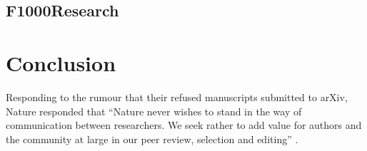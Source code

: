 \documentclass[letterpaper,twocolumn,superscriptaddress,showkeys]{revtex4}
\begin{document}

\subsection{F1000Research}


\section{Conclusion}


Responding to the rumour that their refused manuscripts submitted to arXiv,
Nature responded that ``Nature never wishes to stand in the way of communication
between researchers. We seek rather to add value for authors and the community
at large in our peer review, selection and editing'' \cite{nat05}.

\newpage


\end{document}
